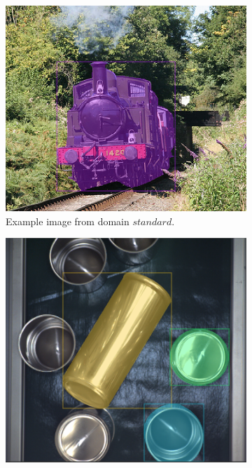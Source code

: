 \begin{figure} 
	\centering
	\begin{subfigure}[b]{0.45\textwidth}
		\centering
		\includegraphics[width=\textwidth]{figures/chap44_standard.png}
		\caption{
			Example image from domain $ standard $.
		} \label{fig:ch4:sec4:domain_standard}
	\end{subfigure}
	\hfill	
	\begin{subfigure}[b]{0.45\textwidth}
		\centering
		\includegraphics[width=\textwidth]{figures/chap44_industrial.png}

\end{subfigure}
\end{figure}
